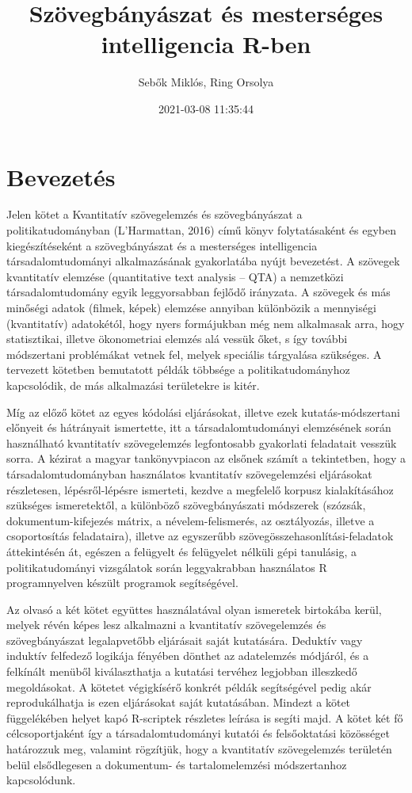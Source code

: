\documentclass[
]{book}
\title{Szövegbányászat és mesterséges intelligencia R-ben}
\author{Sebők Miklós, Ring Orsolya}
\date{2021-03-08 11:35:44}
\begin{document}
\frontmatter
\maketitle

\mainmatter
\hypertarget{bevezetuxe9s}{%
\chapter{Bevezetés}\label{bevezetuxe9s}}

Jelen kötet a Kvantitatív szövegelemzés és szövegbányászat a
politikatudományban (L'Harmattan, 2016) című könyv folytatásaként és
egyben kiegészítéseként a szövegbányászat és a mesterséges intelligencia
társadalomtudományi alkalmazásának gyakorlatába nyújt bevezetést. A
szövegek kvantitatív elemzése (quantitative text analysis -- QTA) a
nemzetközi társadalomtudomány egyik leggyorsabban fejlődő irányzata. A
szövegek és más minőségi adatok (filmek, képek) elemzése annyiban
különbözik a mennyiségi (kvantitatív) adatokétól, hogy nyers formájukban
még nem alkalmasak arra, hogy statisztikai, illetve ökonometriai elemzés
alá vessük őket, s így további módszertani problémákat vetnek fel,
melyek speciális tárgyalása szükséges. A tervezett kötetben bemutatott
példák többsége a politikatudományhoz kapcsolódik, de más alkalmazási
területekre is kitér.

Míg az előző kötet az egyes kódolási eljárásokat, illetve ezek
kutatás-módszertani előnyeit és hátrányait ismertette, itt a
társadalomtudományi elemzésének során használható kvantitatív
szövegelemzés legfontosabb gyakorlati feladatait vesszük sorra. A
kézirat a magyar tankönyvpiacon az elsőnek számít a tekintetben, hogy a
társadalomtudományban használatos kvantitatív szövegelemzési eljárásokat
részletesen, lépésről-lépésre ismerteti, kezdve a megfelelő korpusz
kialakításához szükséges ismeretektől, a különböző szövegbányászati
módszerek (szózsák, dokumentum-kifejezés mátrix, a névelem-felismerés,
az osztályozás, illetve a csoportosítás feladataira), illetve az
egyszerűbb szövegösszehasonlítási-feladatok áttekintésén át, egészen a
felügyelt és felügyelet nélküli gépi tanulásig, a politikatudományi
vizsgálatok során leggyakrabban használatos R programnyelven készült
programok segítségével.

Az olvasó a két kötet együttes használatával olyan ismeretek birtokába
kerül, melyek révén képes lesz alkalmazni a kvantitatív szövegelemzés és
szövegbányászat legalapvetőbb eljárásait saját kutatására. Deduktív vagy
induktív felfedező logikája fényében dönthet az adatelemzés módjáról, és
a felkínált menüből kiválaszthatja a kutatási tervéhez legjobban
illeszkedő megoldásokat. A kötetet végigkísérő konkrét példák
segítségével pedig akár reprodukálhatja is ezen eljárásokat saját
kutatásában. Mindezt a kötet függelékében helyet kapó R-scriptek
részletes leírása is segíti majd. A kötet két fő célcsoportjaként így a
társadalomtudományi kutatói és felsőoktatási közösséget határozzuk meg,
valamint rögzítjük, hogy a kvantitatív szövegelemzés területén belül
elsődlegesen a dokumentum- és tartalomelemzési módszertanhoz
kapcsolódunk.
\end{document}
